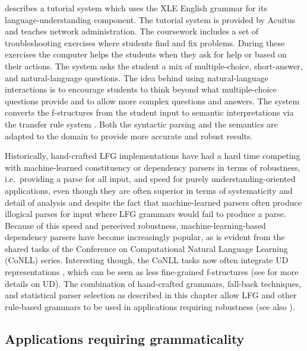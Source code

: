 \documentclass[output=paper,hidelinks]{langscibook}
\begin{document}
\cite{burton06} describes a tutorial system which uses the XLE English grammar for its language-understanding component. The tutorial system is provided by Acuitus and  teaches network administration. The coursework includes a set of troubleshooting exercises where students find and fix problems. During these exercises the computer helps the students  when they ask for help or based on their actions. The system asks the student a mix of multiple-choice, short-answer, and natural-language questions. The idea behind using natural-language interactions is to encourage students to think beyond what multiple-choice questions provide and to allow more complex questions and answers. The system converts the f-structures from the student  input  to semantic interpretations via the transfer rule system \citep{crouch06}. Both the syntactic parsing and the semantics are adapted to the domain to provide more accurate and robust results.

Historically, hand-crafted LFG implementations have had a hard time competing with machine-learned constituency or dependency parsers  in terms of robustness, i.e.\ providing a parse for all input, and speed for purely understanding-oriented applications, even though they are often superior  in terms of systematicity and detail of analysis and despite the fact that machine-learned parsers often produce illogical parses for input where LFG grammars would fail to produce a parse. Because of this speed and perceived robustness, machine-learning-based dependency parsers 
have become increasingly popular, as is evident from the shared tasks of the Conference on Computational Natural Language Learning (CoNLL) series. Interesting though, the CoNLL tasks now often integrate UD representations \citep{universaldep13}, which can be seen as less fine-grained f-structures (see  for more details on UD). The combination of hand-crafted grammars, fall-back techniques, and statistical parser selection as described in this chapter allow LFG and other rule-based grammars to be used in applications requiring robustness (see also \cite{ivanovaetal16}).


% 
\subsection{Applications requiring grammaticality}

\end{document}
